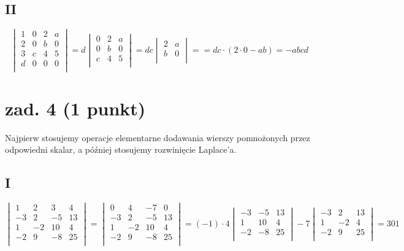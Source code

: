 \documentclass{article}
\begin{document}
\subsection*{II}
$$
\begin{vmatrix}
1 & 0 & 2 & a \\
2 & 0 & b & 0 \\
3 & c & 4 & 5 \\
d & 0 & 0 & 0 \\
\end{vmatrix} = 
d
\begin{vmatrix}
0 & 2 & a \\
0 & b & 0 \\
c & 4 & 5 \\
\end{vmatrix} = 
dc
\begin{vmatrix}
2 & a \\
b & 0 \\
\end{vmatrix} = =dc \cdot (2\cdot0 - ab) = -abcd
$$
\section{zad. 4 (1 punkt)}
Najpierw stosujemy operacje elementarne dodawania wierszy pomnożonych przez odpowiedni skalar, a później stosujemy rozwinięcie Laplace'a.
\subsection*{I}
$$
\begin{vmatrix}
1 & 2 & 3 & 4 \\
-3 & 2 & -5 & 13 \\
1 & -2 & 10 & 4 \\
-2 & 9 & -8 & 25 \\
\end{vmatrix} = 
\begin{vmatrix}
0 & 4 & -7 & 0 \\
-3 & 2 & -5 & 13 \\
1 & -2 & 10 & 4 \\
-2 & 9 & -8 & 25 \\
\end{vmatrix} = 
(-1)\cdot4
\begin{vmatrix}
-3 & -5 & 13 \\
1 & 10 & 4 \\
-2 & -8 & 25 \\
\end{vmatrix}
-7
\begin{vmatrix}
-3 & 2  & 13 \\
1 & -2  & 4 \\
-2 & 9  & 25 \\
\end{vmatrix} = 301
$$
\end{document}
